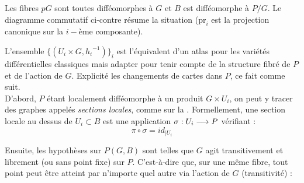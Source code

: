 \begin{definition}
\begin{adjustbox}{valign=C,raise=1cm, minipage={1.1\linewidth}}
		Les fibres $pG$ sont toutes difféomorphes à $G$ et $B$ est difféomorphe à $P/G$. Le diagramme commutatif ci-contre résume la situation ($\text{pr}_i$ est la projection canonique sur la $i-$ème composante).
	\end{adjustbox}
\end{definition}
\skipl 


L'ensemble $\big\{(U_i\times G, {h_i}^{-1})\big\}_i$ est l'équivalent d'un atlas pour les variétés différentielles classiques mais adapter pour tenir compte de la structure fibré de $P$ et de l'action de $G$. Explicité les changements de cartes dans $P$, ce fait comme suit.
\\
D'abord, $P$ étant localement difféomorphe à un produit $G\times U_i$, on peut y tracer des graphes appelés \emph{sections locales}, comme sur la  . Formellement, une section locale au dessus  de $U_i \subset B$ est une application $\sigma : U_i \longrightarrow P$ vérifiant :
\[\pi\circ \sigma = id_{{\displaystyle |}U_i}\]
\begin{figure}[H]
	\begin{floatrow}
		
	\end{floatrow}
\end{figure}
\noindent
Ensuite, les hypothèses sur $P(G,B)$ sont telles que $G$ agit transitivement et librement (ou sans point fixe) sur $P$. C'est-à-dire que, sur une même fibre, tout point peut être atteint par n'importe quel autre via l'action de $G$ (transitivité) :
